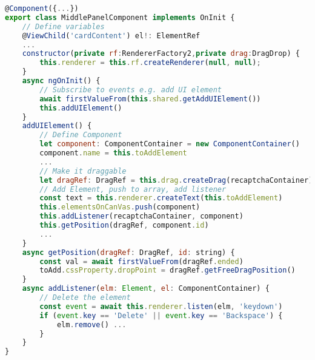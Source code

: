 \begin{lstlisting}[language=JavaScript, caption=The Typescript File for the Middle Panel, label=listing:implementation:middle]
@Component({...})
export class MiddlePanelComponent implements OnInit {
    // Define variables
    @ViewChild('cardContent') el!: ElementRef
    ...
    constructor(private rf:RendererFactory2,private drag:DragDrop) {
        this.renderer = this.rf.createRenderer(null, null);
    }
    async ngOnInit() {
        // Subscribe to events e.g. add UI element
        await firstValueFrom(this.shared.getAddUIElement())
        this.addUIElement()
    }
    addUIElement() {
        // Define Component
        let component: ComponentContainer = new ComponentContainer()
        component.name = this.toAddElement
        ...
        // Make it draggable
        let dragRef: DragRef = this.drag.createDrag(recaptchaContainer).withBoundaryElement(this.el)
        // Add Element, push to array, add listener
        const text = this.renderer.createText(this.toAddElement)
        this.elementsOnCanVas.push(component)
        this.addListener(recaptchaContainer, component)
        this.getPosition(dragRef, component.id)
        ...
    }
    async getPosition(dragRef: DragRef, id: string) {
        const val = await firstValueFrom(dragRef.ended)
        toAdd.cssProperty.dropPoint = dragRef.getFreeDragPosition()
    }
    async addListener(elm: Element, el: ComponentContainer) {
        // Delete the element 
        const event = await this.renderer.listen(elm, 'keydown')
        if (event.key == 'Delete' || event.key == 'Backspace') {
            elm.remove() ...
        }
    }
}
\end{lstlisting}

